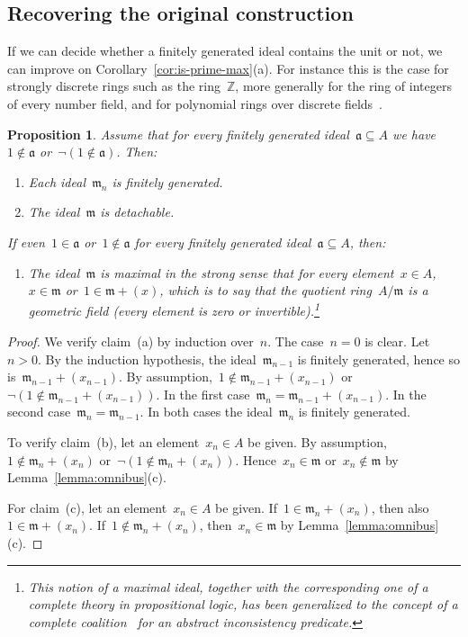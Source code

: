\documentclass[com,11pt,crcready]{iosart2x}
\theoremstyle{definition}
\theoremstyle{plain}
\newtheorem{proposition}[definition]{Proposition}
\theoremstyle{remark}
\newcommand{\aaa}{\mathfrak{a}}
\newcommand{\mmm}{\mathfrak{m}}
\newcommand{\ZZ}{\mathbb{Z}}
\renewcommand{\_}{\mathpunct{.}\,}
\begin{document}
\subsection{Recovering the original construction}

If we can decide whether a finitely generated ideal contains the
unit or not, we can improve on Corollary~\ref{cor:is-prime-max}(a). For instance this is the case for
strongly discrete rings such as the ring~$\ZZ$, more generally for the ring of
integers of every number field, and for polynomial rings over discrete
fields~\cite[Theorem~VIII.1.5]{mines-richman-ruitenburg:constructive-algebra}.

\begin{proposition}\label{prop:with-test}
Assume that for every finitely generated ideal~$\aaa \subseteq A$ we have~$1
\not\in \aaa$ or~$\neg(1 \not\in \aaa)$. Then:
\begin{enumerate}
\item[\textnormal{(a)}] Each ideal~$\mmm_n$ is finitely generated.
\item[\textnormal{(b)}] The ideal~$\mmm$ is detachable.
\end{enumerate}
If even~$1 \in \aaa$ or~$1 \not\in \aaa$ for every finitely generated ideal~$\aaa \subseteq
A$, then:
\begin{enumerate}
\addtocounter{enumi}{2}
\item[\textnormal{(c)}] The ideal~$\mmm$ is maximal in the strong sense that for every element~$x
\in A$,~$x \in \mmm$ or~$1 \in \mmm + (x)$, which is to say that the quotient ring~$A/\mmm$ is a
\emph{geometric field} (every element is zero or invertible).\footnote{This
notion of a maximal ideal, together with the corresponding one of a complete
theory in propositional logic, has been generalized to the concept of a
complete coalition~\cite{schuster-wessel:cie2020,schuster-wessel:jacincpred} for an abstract inconsistency
predicate.}
\end{enumerate}
\end{proposition}

\begin{proof}We verify claim~(a) by induction over~$n$. The case~$n = 0$ is
clear. Let~$n > 0$. By the induction hypothesis, the ideal~$\mmm_{n-1}$ is finitely
generated, hence so is~$\mmm_{n-1} + (x_{n-1})$. By assumption,~$1 \not\in \mmm_{n-1} +
(x_{n-1})$ or~$\neg(1 \not\in \mmm_{n-1} + (x_{n-1}))$. In the first
case~$\mmm_n = \mmm_{n-1} + (x_{n-1})$. In the second case~$\mmm_n =
\mmm_{n-1}$. In both cases
the ideal~$\mmm_n$ is finitely generated.

To verify claim~(b), let an element~$x_n \in A$ be given. By assumption,~$1
\not\in \mmm_n + (x_n)$ or~$\neg(1 \not\in \mmm_n + (x_n))$. Hence~$x_n \in
\mmm$ or~$x_n \not\in \mmm$ by Lemma~\ref{lemma:omnibus}(c).

For claim~(c), let an element~$x_n \in A$ be given. If~$1 \in \mmm_n + (x_n)$,
then also~$1 \in \mmm + (x_n)$. If~$1 \not\in \mmm_n + (x_n)$, then~$x_n \in
\mmm$ by Lemma~\ref{lemma:omnibus}(c).
\end{proof}
\end{document}
